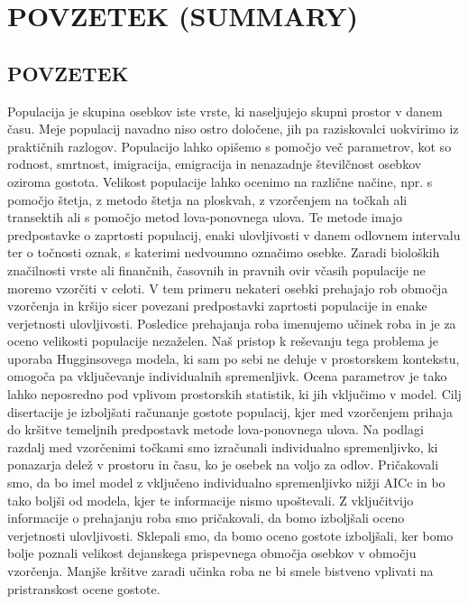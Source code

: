\section{POVZETEK (SUMMARY)}
\subsection{POVZETEK}
Populacija je skupina osebkov iste vrste, ki naseljujejo skupni prostor v danem času. Meje populacij navadno niso ostro določene, jih pa raziskovalci uokvirimo iz praktičnih razlogov. Populacijo lahko opišemo s pomočjo več parametrov, kot so rodnost, smrtnost, imigracija, emigracija in nenazadnje številčnost osebkov oziroma gostota. Velikost populacije lahko ocenimo na različne načine, npr. s pomočjo štetja, z metodo štetja na ploskvah, z vzorčenjem na točkah ali transektih ali s pomočjo metod lova-ponovnega ulova. Te metode imajo predpostavke o zaprtosti populacij, enaki ulovljivosti v danem odlovnem intervalu ter o točnosti oznak, s katerimi nedvoumno označimo osebke. Zaradi bioloških značilnosti vrste ali finančnih, časovnih in pravnih ovir včasih populacije ne moremo vzorčiti v celoti. V tem primeru nekateri osebki prehajajo rob območja vzorčenja in kršijo sicer povezani predpostavki zaprtosti populacije in enake verjetnosti ulovljivosti. Posledice prehajanja roba imenujemo učinek roba in je za oceno velikosti populacije nezaželen. Naš pristop k reševanju tega problema je uporaba Hugginsovega modela, ki sam po sebi ne deluje v prostorskem kontekstu, omogoča pa vključevanje individualnih spremenljivk. Ocena parametrov je tako lahko neposredno pod vplivom prostorskih statistik, ki jih vključimo v model. Cilj disertacije je izboljšati računanje gostote populacij, kjer med vzorčenjem prihaja do kršitve temeljnih predpostavk metode lova-ponovnega ulova. Na podlagi razdalj med vzorčenimi točkami smo izračunali individualno spremenljivko, ki ponazarja delež v prostoru in času, ko je osebek na voljo za odlov. Pričakovali smo, da bo imel model z vključeno individualno spremenljivko nižji AICc in bo tako boljši od modela, kjer te informacije nismo upoštevali. Z vključitvijo informacije o prehajanju roba smo pričakovali, da bomo izboljšali oceno verjetnosti ulovljivosti. Sklepali smo, da bomo oceno gostote izboljšali, ker bomo bolje poznali velikost dejanskega prispevnega območja osebkov v območju vzorčenja. Manjše kršitve zaradi učinka roba ne bi smele bistveno vplivati na pristranskost ocene gostote.

